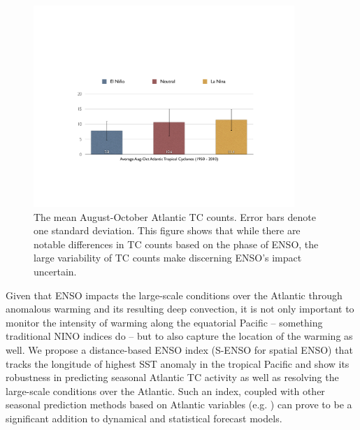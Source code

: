  





\begin{figure}[htbp]
	\centering
		\includegraphics[height=3in]{figures/nino_tc_bars.pdf}
	\caption{The mean August-October Atlantic TC counts. Error bars denote one standard deviation. This figure shows that while there are notable differences in TC counts based on the phase of ENSO, the large variability of TC counts make discerning ENSO's impact uncertain.}
	\label{fig:figures_nino_tc_bars}
\end{figure}

Given that ENSO impacts the large-scale conditions over the Atlantic through anomalous warming and its resulting deep convection, it is not only important to monitor the intensity of warming along the equatorial Pacific -- something traditional NINO indices do -- but to also capture the location of the warming as well. We propose a distance-based ENSO index (S-ENSO for spatial ENSO) that tracks the longitude of highest SST anomaly in the tropical Pacific and show its robustness in predicting seasonal Atlantic TC activity as well as resolving the large-scale conditions over the Atlantic. Such an index, coupled with other seasonal prediction methods based on Atlantic variables (e.g. \cite{knutson2007, emanuel2008simulation}) can prove to be a significant addition to dynamical and statistical forecast models.

